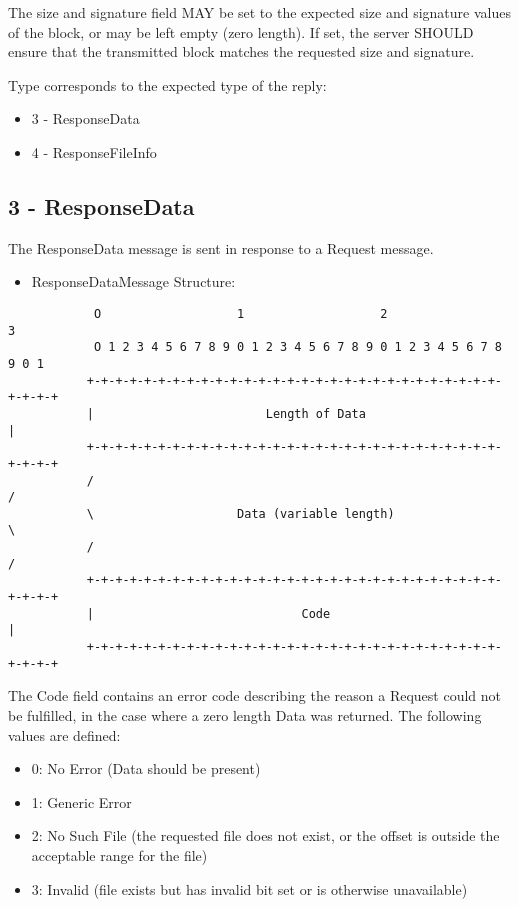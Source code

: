 The size and signature field MAY be set to the expected size and
signature values of the block, or may be left empty (zero length).
If set, the server SHOULD ensure that the transmitted block matches
the requested size and signature.

Type corresponds to the expected type of the reply:
\begin{itemize}
 \item 3 - ResponseData
 \item 4 - ResponseFileInfo
\end{itemize}

\subsection{3 - ResponseData}

The ResponseData message is sent in response to a Request message.

\begin{itemize}
 \item ResponseDataMessage Structure:
\end{itemize}

\begin{verbatim}
            O                   1                   2                   3
            O 1 2 3 4 5 6 7 8 9 0 1 2 3 4 5 6 7 8 9 0 1 2 3 4 5 6 7 8 9 0 1
           +-+-+-+-+-+-+-+-+-+-+-+-+-+-+-+-+-+-+-+-+-+-+-+-+-+-+-+-+-+-+-+-+
           |                        Length of Data                         |
           +-+-+-+-+-+-+-+-+-+-+-+-+-+-+-+-+-+-+-+-+-+-+-+-+-+-+-+-+-+-+-+-+
           /                                                               /
           \                    Data (variable length)                     \
           /                                                               /
           +-+-+-+-+-+-+-+-+-+-+-+-+-+-+-+-+-+-+-+-+-+-+-+-+-+-+-+-+-+-+-+-+
           |                             Code                              |
           +-+-+-+-+-+-+-+-+-+-+-+-+-+-+-+-+-+-+-+-+-+-+-+-+-+-+-+-+-+-+-+-+
\end{verbatim}

The Code field contains an error code describing the reason a Request
could not be fulfilled, in the case where a zero length Data was
returned. The following values are defined:


\begin{itemize}
 \item 0: No Error (Data should be present)
 \item 1: Generic Error
 \item 2: No Such File (the requested file does not exist, or the offset is
  outside the acceptable range for the file)
 \item 3: Invalid (file exists but has invalid bit set or is otherwise
  unavailable)
\end{itemize}

